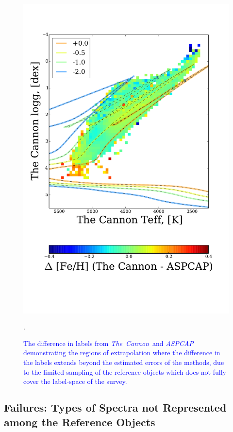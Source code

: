 \documentclass[12pt, preprint]{aastex}
\newcommand{\tc}{\textsl{The~Cannon}}
\newcommand{\aspcap}{\textsl{ASPCAP}}
\begin{document}
\begin{figure}[!h]
    \includegraphics[scale=0.26]{./plots/aftersubmit/feh_diff2.pdf}
    \caption{\textcolor{blue}{The difference in labels from \tc\ and \aspcap\, demonstrating the regions of extrapolation where the difference in the labels extends beyond the estimated errors of the methods, due to the limited sampling of the reference objects which does not fully cover the label-space of the survey.}}
    \label{fig:sigma2}.
\end{figure}




\subsection{Failures: Types of Spectra not Represented among the Reference Objects}
\label{sec:AnomalousSpectra}
\end{document}
